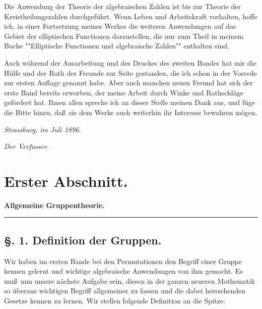 \documentclass[12pt,a4paper]{book}
\begin{document}
Die Anwendung der Theorie der algebraischen Zahlen ist bis zur Theorie der Kreistheilungszahlen durchgef\"uhrt. Wenn Leben und Arbeitskraft vorhalten, hoffe ich, in einer Fortsetzung meines Werkes die weiteren Anwendungen auf das Gebiet der elliptischen Functionen darzustellen, die nur zum Theil in meinem Buche ""Elliptische Functionen und algebraische Zahlen"" enthalten sind.

Auch w\"ahrend der Ausarbeitung und des Druckes des zweiten Bandes hat mir die H\"ulfe und der Rath der Freunde zur Seite gestanden, die ich schon in der Vorrede zur ersten Auflage genannt habe. Aber auch manchen neuen Freund hat sich der erste Band bereits erworben, der meine Arbeit durch Winke und Rathschl\"age gef\"ordert hat. Ihnen allen spreche ich an dieser Stelle meinen Dank aus, und f\"uge die Bitte hinzu, da\ss\ sie dem Werke auch weiterhin ihr Interesse bewahren m\"ogen.

\vspace{0.5cm}
\noindent\textit{Strassburg, im Juli 1896.}

\begin{flushright}
\textit{Der Verfasser.}
\end{flushright}

\tableofcontents

\mainmatter

\chapter*{Erster Abschnitt.}

\begin{center}
\textbf{Allgemeine Gruppentheorie.}
\end{center}

\begin{flushright}
\rule{5cm}{0.4pt}
\end{flushright}

\section*{\S. 1. Definition der Gruppen.}

Wir haben im ersten Bande bei den Permutationen den Begriff einer Gruppe kennen gelernt und wichtige algebraische Anwendungen von ihm gemacht. Es mu\ss\ nun unsere n\"achste Aufgabe sein, diesen in der ganzen neueren Mathematik so \"uberaus wichtigen Begriff allgemeiner zu fassen und die dabei herrschenden Gesetze kennen zu lernen. Wir stellen folgende Definition an die Spitze:
\end{document}
